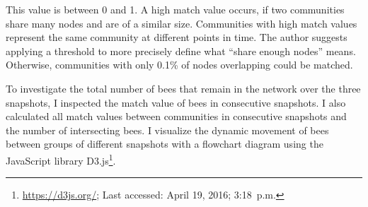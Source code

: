 This value is between 0 and 1.
A high match value occurs, if two communities share many nodes and are of a similar size.
Communities with high match values represent the same community at different points in time.
The author suggests applying a threshold to more precisely define what ``share enough nodes'' means.
Otherwise, communities with only 0.1\% of nodes overlapping could be matched.

To investigate the total number of bees that remain in the network over the three snapshots, I inspected the match value of bees in consecutive snapshots.
I also calculated all match values between communities in consecutive snapshots and  the number of intersecting bees. I visualize the dynamic movement
of bees between groups of different snapshots with a flowchart diagram using the JavaScript library D3.js\footnote{\url{https://d3js.org/}; Last accessed: April 19, 2016; 3:18~p.m.}.